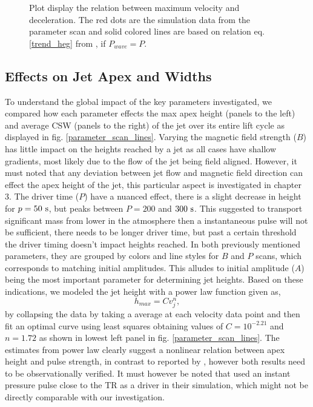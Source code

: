 \documentclass[12pt]{ociamthesis}
\newcommand{\fref}[1]{fig. \ref{#1}}
\newcommand{\np}{\\ \\}
\begin{document}
\begin{figure}
\captionsetup[subfigure]{labelformat=empty}
\centering
{} 
\caption{Plot display the relation between maximum velocity and deceleration. The red dots are the simulation data from the parameter scan and solid colored lines are based on relation eq. \eqref{trend_heg} from \cite{Heggland2007ApJ6661277H}, if $P_{wave}=P$.}
\label{decell}
\end{figure}
\subsection{Effects on Jet Apex and Widths}
\label{subsec:jet_apex_widths}
To understand the global impact of the key parameters investigated, we compared how each parameter effects the max apex height (panels to the left) and average CSW (panels to the right) of the jet over its entire lift cycle as displayed in \fref{parameter_scan_lines}. Varying the magnetic field strength ($B$) has little impact on the heights reached by a jet as all cases have shallow gradients, most likely due to the flow of the jet being field aligned. However, it must noted that any deviation between jet flow and magnetic field direction can effect the apex height of the jet, this particular aspect is investigated in chapter 3. The driver time ($P$) have a nuanced effect, there is a slight decrease in height for $p=50~\rm{s}$, but peaks between $P=200$ and $300~\rm{s}$. This suggested to transport significant mass from lower in the atmosphere then a instantaneous pulse will not be sufficient, there needs to be longer driver time, but past a certain threshold the driver timing doesn't impact heights reached. In both previously mentioned parameters, they are grouped by colors and line styles for $B$ and $P$ scans, which corresponds to matching initial amplitudes. This alludes to initial amplitude ($A$) being the most important parameter for determining jet heights. Based on these indications, we modeled the jet height with a power law function given as,   
\begin{equation}
h_{max} = C v_j^{n},
\end{equation} 
by collapsing the data by taking a average at each velocity data point and then fit an optimal curve using least squares obtaining values of $C= 10^{-2.21}$ and $n= 1.72$ as shown in lowest left panel in \fref{parameter_scan_lines}. The estimates from power law clearly suggest a nonlinear relation between apex height and pulse strength, in contrast to reported by \citet{Singh2019}, however both results need to be observationally verified. It must however be noted that \citet{Singh2019} used an instant pressure pulse close to the TR as a driver in their simulation, which might not be directly comparable with our investigation. \np  
\end{document}
